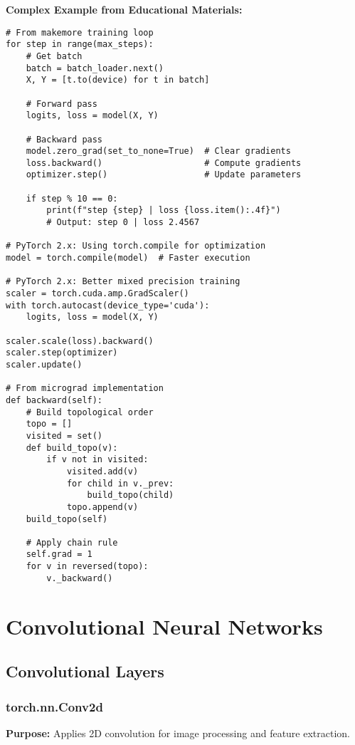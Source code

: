 \documentclass[11pt,a4paper]{book}
\begin{document}
\textbf{Complex Example from Educational Materials:}
\begin{verbatim}
# From makemore training loop
for step in range(max_steps):
    # Get batch
    batch = batch_loader.next()
    X, Y = [t.to(device) for t in batch]
    
    # Forward pass
    logits, loss = model(X, Y)
    
    # Backward pass
    model.zero_grad(set_to_none=True)  # Clear gradients
    loss.backward()                    # Compute gradients
    optimizer.step()                   # Update parameters
    
    if step % 10 == 0:
        print(f"step {step} | loss {loss.item():.4f}")
        # Output: step 0 | loss 2.4567

# PyTorch 2.x: Using torch.compile for optimization
model = torch.compile(model)  # Faster execution

# PyTorch 2.x: Better mixed precision training
scaler = torch.cuda.amp.GradScaler()
with torch.autocast(device_type='cuda'):
    logits, loss = model(X, Y)
    
scaler.scale(loss).backward()
scaler.step(optimizer)
scaler.update()

# From micrograd implementation
def backward(self):
    # Build topological order
    topo = []
    visited = set()
    def build_topo(v):
        if v not in visited:
            visited.add(v)
            for child in v._prev:
                build_topo(child)
            topo.append(v)
    build_topo(self)
    
    # Apply chain rule
    self.grad = 1
    for v in reversed(topo):
        v._backward()
\end{verbatim}

\chapter{Convolutional Neural Networks}

\section{Convolutional Layers}

\subsection{torch.nn.Conv2d}

\textbf{Purpose:} Applies 2D convolution for image processing and feature extraction.
\end{document}
